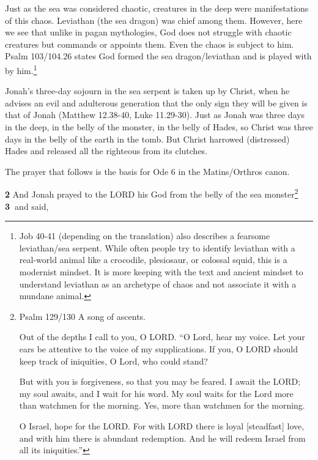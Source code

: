 \documentclass[
]{article}
\newcommand{\RL}[1]{\beginR #1\endR}
\begin{document}
Just as the sea was considered chaotic, creatures in the deep were
manifestations of this chaos. Leviathan (the sea dragon) was chief among
them. However, here we see that unlike in pagan mythologies, God does
not struggle with chaotic creatures but commands or appoints them. Even
the chaos is subject to him. Psalm 103/104.26 states God formed the sea
dragon/leviathan and is played with by him.\footnote{Job 40-41
  (depending on the translation) also describes a fearsome leviathan/sea
  serpent. While often people try to identify leviathan with a
  real-world animal like a crocodile, plesiosaur, or colossal squid,
  this is a modernist mindset. It is more keeping with the text and
  ancient mindset to understand leviathan as an archetype of chaos and
  not associate it with a mundane animal.}

Jonah's three-day sojourn in the sea serpent is taken up by Christ, when
he advises an evil and adulterous generation that the only sign they
will be given is that of Jonah (Matthew 12.38-40, Luke 11.29-30). Just
as Jonah was three days in the deep, in the belly of the monster, in the
belly of Hades, so Christ was three days in the belly of the earth in
the tomb. But Christ harrowed (distressed) Hades and released all the
righteous from its clutches.

The prayer that follows is the basis for Ode 6 in the Matins/Orthros
canon.

\textbf{2} And Jonah prayed to the LORD his God from the belly of the
sea monster\footnote{Psalm 129/130 A song of ascents.

  Out of the depths I call to you, O LORD. \RL{``}O Lord, hear my voice.
  Let your ears be attentive to the voice of my supplications. If you, O
  LORD should keep track of iniquities, O Lord, who could stand?

  But with you is forgiveness, so that you may be feared. I await the
  LORD; my soul awaits, and I wait for his word. My soul waits for the
  Lord more than watchmen for the morning. Yes, more than watchmen for
  the morning.

  O Israel, hope for the LORD. For with LORD there is loyal
  {[}steadfast{]} love, and with him there is abundant redemption. And
  he will redeem Israel from all its iniquities.''} \textbf{3~}and said,
\end{document}
